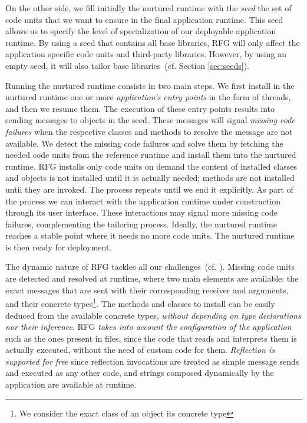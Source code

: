 On the other side, we fill initially the nurtured runtime with the \emph{seed} \ie the set of code units that we want to ensure in the final application runtime. This seed allows us to specify the level of specialization of our deployable application runtime.
By using a seed that contains all base libraries, RFG will only affect the application specific code units and third-party libraries.
However, by using an empty seed, it will also tailor base libraries~(cf. Section \ref{sec:seeds}).

Running the nurtured runtime consists in two main steps. We first install in the nurtured runtime one or more \emph{application's entry points} in the form of threads, and then we resume them.
The execution of these entry points results into sending messages to objects in the seed. These messages will signal \emph{missing code failures} when the respective classes and methods to resolve the message are not available.
We detect the missing code failures and solve them by fetching the needed code units from the reference runtime and install them into the nurtured runtime. RFG installs only code units on demand \ie the content of installed classes and objects is not installed until it is actually needed; methods are not installed until they are invoked.
The process repeats until we end it explicitly. As part of the process we can interact with the application runtime under construction through \eg its user interface. These interactions may signal more missing code failures, complementing the tailoring process. Ideally, the nurtured runtime reaches a stable point where it needs no more code units.
The nurtured runtime is then ready for deployment.

The dynamic nature of RFG tackles all our challenges~(cf. ). Missing code units are detected and resolved at runtime, where two main elements are available: the exact messages that are sent with their corresponding receiver and arguments, and their concrete types\footnote{We consider the exact class of an object its concrete type}. The methods and classes to install can be easily deduced from the available concrete types, \emph{without depending on type declarations nor their inference}. RFG \emph{takes into account the configuration of the application} such as the ones present in files, since the code that reads and interprets them is actually executed, without the need of custom code for them. \emph{Reflection is supported for free} since reflection invocations are treated as simple message sends and executed as any other code, and strings composed dynamically by the application are available at runtime. 



